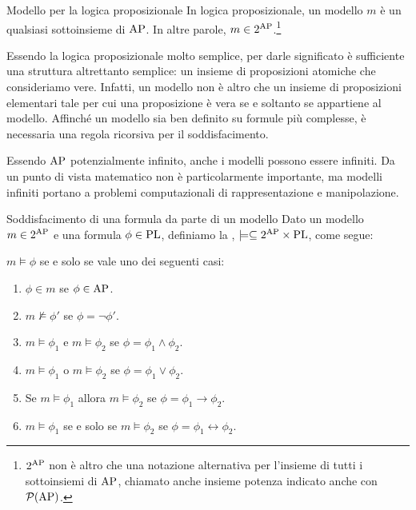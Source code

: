 \begin{definition}{Modello per la logica proposizionale}
  In logica proposizionale, un modello \(m\) è un qualsiasi sottoinsieme di \(\AP\). In altre parole, \(m \in 2^{\AP}\).\footnote{\(2^{\AP}\) non è altro che una notazione alternativa per l'insieme di tutti i sottoinsiemi di \(\AP\), chiamato anche insieme potenza indicato anche con \(\mathcal{P}(\AP)\).}
\end{definition}

Essendo la logica proposizionale molto semplice, per darle significato è sufficiente una struttura altrettanto semplice: un insieme di proposizioni atomiche che consideriamo vere.
Infatti, un modello non è altro che un insieme di proposizioni elementari tale per cui una proposizione è vera se e soltanto se appartiene al modello.
Affinché un modello sia ben definito su formule più complesse, è necessaria una regola ricorsiva per il soddisfacimento.

\begin{note}{}
Essendo \(\AP\) potenzialmente infinito, anche i modelli possono essere infiniti. Da un punto di vista matematico non è particolarmente importante, ma modelli infiniti portano a problemi computazionali di rappresentazione e manipolazione.
\end{note}

\begin{definition}{Soddisfacimento di una formula da parte di un modello}
  Dato un modello \(m \in 2^{\AP}\) e una formula \(\phi \in \operatorname{PL}\), definiamo la , \(\models \subseteq 2^{\AP} \times \PL\), come segue:

  \(m\models \phi \) se e solo se vale uno dei seguenti casi:
  \begin{enumerate}
    \item \(\phi \in m\) se \(\phi \in \AP\).
    \item \(m \not\models \phi'\) se \(\phi = \neg \phi'\).
    \item \(m \models \phi_1\) e \(m \models \phi_2\) se \(\phi = \phi_1 \land \phi_2\).
    \item \(m \models \phi_1\) o \(m \models \phi_2\) se \(\phi = \phi_1 \lor \phi_2\).
    \item Se \(m \models \phi_1\) allora \(m \models \phi_2\) se \(\phi = \phi_1 \rightarrow \phi_2\).
    \item \(m \models \phi_1\) se e solo se \(m \models \phi_2\) se \(\phi = \phi_1 \leftrightarrow \phi_2\).
  \end{enumerate}
\end{definition}

